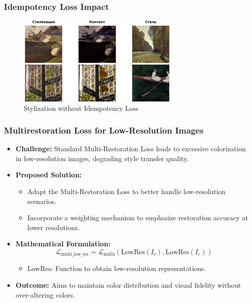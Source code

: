 \begin{frame}
\frametitle{Idempotency Loss Impact}
\begin{figure}[H]
    \centering
    \includegraphics[width=0.7\textwidth]{figures/without_idempotency.png}
    \caption{Stylization without Idempotency Loss}
    \label{fig:without_idempotency_result}
\end{figure}
\end{frame}

\begin{frame}
\frametitle{Multirestoration Loss for Low-Resolution Images}

\begin{itemize}
    \item \textbf{Challenge:} Standard Multi-Restoration Loss leads to excessive colorization in low-resolution images, degrading style transfer quality.
    \item \textbf{Proposed Solution:}
    \begin{itemize}
        \item Adapt the Multi-Restoration Loss to better handle low-resolution scenarios.
        \item Incorporate a weighting mechanism to emphasize restoration accuracy at lower resolutions.
    \end{itemize}
    \item \textbf{Mathematical Formulation:}
    \[
    \mathcal{L}_{\text{multi\_low\_res}} = \mathcal{L}_{\text{multi}}(\text{LowRes}(I_c), \text{LowRes}(I_c))
    \]
    \begin{itemize}
        \item \( \text{LowRes} \): Function to obtain low-resolution representations.
    \end{itemize}
    \item \textbf{Outcome:} Aims to maintain color distribution and visual fidelity without over-altering colors.
\end{itemize}

\end{frame}

